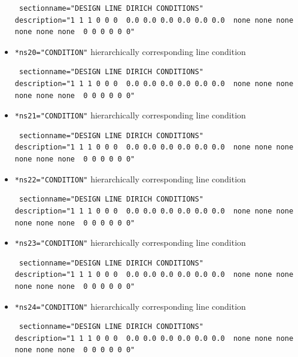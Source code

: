 \begin{itemize}
\begin{small} \begin{verbatim} sectionname="DESIGN LINE DIRICH CONDITIONS"
description="1 1 1 0 0 0  0.0 0.0 0.0 0.0 0.0 0.0  none none none none none none  0 0 0 0 0 0"
\end{verbatim} \end{small} \item \verb|*ns20="CONDITION"| \qquad hierarchically corresponding line condition
\begin{small} \begin{verbatim} sectionname="DESIGN LINE DIRICH CONDITIONS"
description="1 1 1 0 0 0  0.0 0.0 0.0 0.0 0.0 0.0  none none none none none none  0 0 0 0 0 0"
\end{verbatim} \end{small} \item \verb|*ns21="CONDITION"| \qquad hierarchically corresponding line condition
\begin{small} \begin{verbatim} sectionname="DESIGN LINE DIRICH CONDITIONS"
description="1 1 1 0 0 0  0.0 0.0 0.0 0.0 0.0 0.0  none none none none none none  0 0 0 0 0 0"
\end{verbatim} \end{small} \item \verb|*ns22="CONDITION"| \qquad hierarchically corresponding line condition
\begin{small} \begin{verbatim} sectionname="DESIGN LINE DIRICH CONDITIONS"
description="1 1 1 0 0 0  0.0 0.0 0.0 0.0 0.0 0.0  none none none none none none  0 0 0 0 0 0"
\end{verbatim} \end{small} \item \verb|*ns23="CONDITION"| \qquad hierarchically corresponding line condition
\begin{small} \begin{verbatim} sectionname="DESIGN LINE DIRICH CONDITIONS"
description="1 1 1 0 0 0  0.0 0.0 0.0 0.0 0.0 0.0  none none none none none none  0 0 0 0 0 0"
\end{verbatim} \end{small} \item \verb|*ns24="CONDITION"| \qquad hierarchically corresponding line condition
\begin{small} \begin{verbatim} sectionname="DESIGN LINE DIRICH CONDITIONS"
description="1 1 1 0 0 0  0.0 0.0 0.0 0.0 0.0 0.0  none none none none none none  0 0 0 0 0 0"

\end{verbatim}
\end{small}
\end{itemize}
